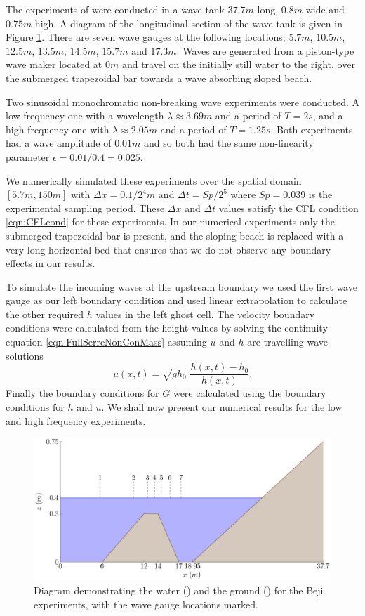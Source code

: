 The experiments of \citet{Beji-Battjes-1994-1} were conducted in a wave tank $37.7m$ long, $0.8m$ wide and $0.75m$ high. A diagram of the longitudinal section of the wave tank is given in Figure \ref{fig:BejiWT}. There are seven wave gauges at the following locations; $5.7m$, $10.5m$, $12.5m$, $13.5m$, $14.5m$, $15.7m$ and $17.3m$. Waves are generated from a piston-type wave maker located at $0m$ and travel on the initially still water to the right, over the submerged trapezoidal bar towards a wave absorbing sloped beach.

Two sinusoidal monochromatic non-breaking wave experiments were conducted. A low frequency one with a wavelength $\lambda \approx 3.69m$ and a period of $T = 2s$, and a high frequency one with $\lambda \approx 2.05m$ and a period of $T = 1.25s$. Both experiments had a wave amplitude of $0.01m$ and so both had the same non-linearity parameter $\epsilon = 0.01 / 0.4 = 0.025$. 

We numerically simulated these experiments over the spatial domain $\left[5.7m,150m\right]$ with $\Delta x = 0.1 / 2^4 m$ and $\Delta t = Sp / 2^5$ where $Sp = 0.039$ is the experimental sampling period. These $\Delta x$ and $\Delta t$ values satisfy the CFL condition \eqref{eqn:CFLcond} for these experiments. In our numerical experiments only the submerged trapezoidal bar is present, and the sloping beach is replaced with a very long horizontal bed that ensures that we do not observe any boundary effects in our results.  

To simulate the incoming waves at the upstream boundary we used the first wave gauge as our left boundary condition and used linear extrapolation to calculate the other required $h$ values in the left ghost cell. The velocity boundary conditions were calculated from the height values by solving the continuity equation \eqref{eqn:FullSerreNonConMass} assuming $u$ and $h$ are travelling wave solutions
\begin{equation*}
u(x,t) = \sqrt{g h_0} \; \dfrac{h(x,t) - h_0}{h(x,t)}.
\end{equation*}
Finally the boundary conditions for $G$ were calculated using the boundary conditions for $h$ and $u$. We shall now present our numerical results for the low and high frequency experiments.
%
\begin{figure}
	\centering
		\includegraphics[width=\textwidth]{./chp6/figures/Experiment/Beji/BejiTank.pdf}
	\caption{Diagram demonstrating the water () and the ground  () for the Beji experiments, with the wave gauge locations marked.}
	\label{fig:BejiWT}
\end{figure}
%
